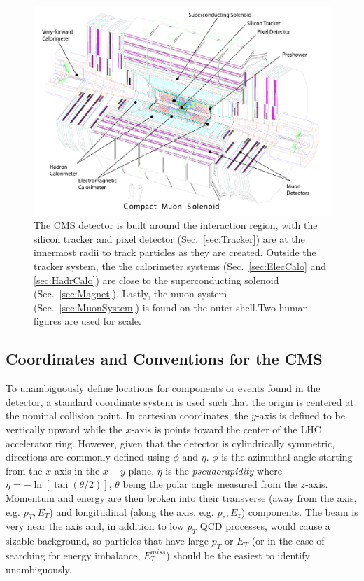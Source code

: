 \begin{figure}[htbp]
\begin{center}
\includegraphics[width=.9\linewidth]{Experiment/figures/ExplodedCMS.pdf}
\caption[The CMS Detector with Sub-Detector Systems]{The CMS detector is built around the interaction region, with the silicon tracker and pixel detector (Sec.~\ref{sec:Tracker}) are at the innermost radii to track particles as they are created. Outside the tracker system, the the calorimeter systems (Sec.~\ref{sec:ElecCalo} and \ref{sec:HadrCalo}) are close to the superconducting solenoid (Sec.~\ref{sec:Magnet}). Lastly, the muon system (Sec.~\ref{sec:MuonSystem}) is found on the outer shell.Two human figures are used for scale.}
\label{fig:ExplodedCMS}
\end{center}
\end{figure}

\subsection{Coordinates and Conventions for the CMS}
\label{sec:CoordinateConventions}

To unambiguously define locations for components or events found in the detector, a standard coordinate system is used such that the origin is centered at the nominal collision point. In cartesian coordinates, the $y$-axis is defined to be vertically upward while the $x$-axis is points toward the center of the LHC accelerator ring. However, given that the detector is cylindrically symmetric, directions are commonly defined using $\phi$ and $\eta$. $\phi$ is the azimuthal angle starting from the $x$-axis in the $x-y$ plane. $\eta$ is the \textit{pseudorapidity} where $\eta=-\ln[\tan(\theta/2)]$, $\theta$ being the polar angle measured from the $z$-axis. Momentum and energy are then broken into their transverse (away from the axis, e.g. $p_T,E_T$) and longitudinal (along the axis, e.g. $p_z,E_z$) components. The beam is very near the axis and, in addition to low $p_T$ QCD processes, would cause a sizable background, so particles that have large $p_T$ or $E_T$ (or in the case of searching for energy imbalance, $E_T^{miss}$) should be the easiest to identify unambiguously.

